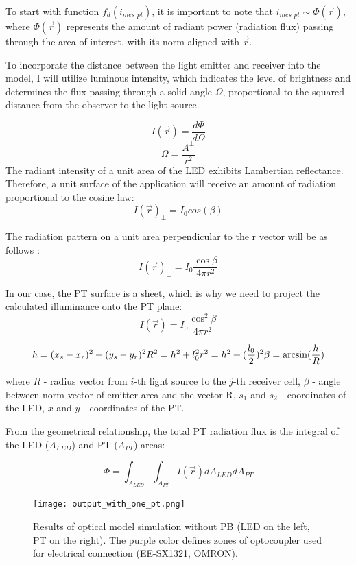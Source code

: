 To start with function $f_d(i_{\textit{mes pt}})$, it is important to note that $i_{\textit{mes pt}} 
\sim \Phi(\vec{r})$, where $\Phi(\vec{r})$ represents the amount of radiant power (radiation flux) passing through the area of interest, with its norm aligned with $\vec{r}$.

To incorporate the distance between the light emitter and receiver into the model, I will utilize luminous intensity, which indicates the level of brightness and determines the flux passing through a solid angle 
$\Omega$, proportional to the squared distance from the observer to the light source.

\[I(\vec{r}) = \frac{d\Phi}{d\Omega} \]
\[\Omega = \frac{A^\perp}{r^2}\]
The radiant intensity of a unit area of the LED exhibits Lambertian reflectance. 
Therefore, a unit surface of the application will receive an amount of radiation proportional to the cosine law:
\[I(\vec{r})_\perp = I_{0} cos (\beta)\]

The radiation pattern on a unit area perpendicular to the r vector will be as follows \cite{my_love_pressure_photosensor}:
\[I(\vec{r})_\perp = I_0 \frac{\cos{\beta}}{4 \pi r^2}\]

In our case, the PT surface is a sheet, which is why we need to project the calculated illuminance onto the PT plane: 
$$I(\vec{r}) = I_0 \frac{\cos^2{\beta}}{4 \pi r^2}$$

\[
h = (x_s- x_r)^2 + (y_s - y_r)^2\\
R^2 = h^2 + l_0^2\\
r^2  = h^2 + (\frac{l_0}{2})^2\\
\beta = \arcsin(\frac{h}{R})\\
\]

where $R$ - radius vector from $i$-th light source to the $j$-th receiver cell,
$\beta$ - angle between norm vector of emitter area and the vector R,
$s_1$ and $s_2$ - coordinates of the LED,
$x$ and $y$ - coordinates of the PT.

From the geometrical relationship, the total PT radiation flux is the integral of the LED ($A_{LED}$) and PT ($A_{PT}$) areas:

\begin{equation}
  \Phi = \int_{A_{LED}} \int_{A_{PT}} I(\vec{r})d A_{LED} d A_{PT}
  \label{eq:flux_calc}
\end{equation}
\begin{figure}[H]
    \texttt{[image: output\_with\_one\_pt.png]}
      \centering
      \caption{Results of optical model simulation without PB (LED on the left, PT on the right). The purple color defines zones of optocoupler used for electrical connection (EE-SX1321, OMRON).}
      \label{fig:led_sim_res_one_pt}
\end{figure}

